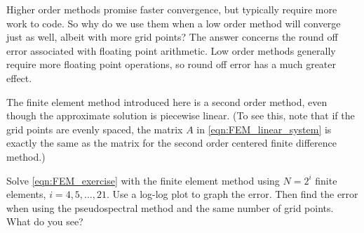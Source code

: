 \begin{problem}
Higher order methods promise faster convergence, but typically require more work to code.
So why do we use them when a low order method will converge just as well, albeit with more grid points?
The answer concerns the round off error associated with floating point arithmetic.
Low order methods generally require more floating point operations, so round off error has a much greater effect.

The finite element method introduced here is a second order method, even though the approximate solution is piecewise linear.
(To see this, note that if the grid points are evenly spaced, the matrix $A$ in \eqref{eqn:FEM_linear_system} is exactly the same as the matrix for the second order centered finite difference method.)

Solve \eqref{eqn:FEM_exercise} with the finite element method using $N = 2^i$  finite elements, $i = 4, 5, \ldots, 21$.
Use a log-log plot to graph the error.
Then find the error when using the pseudospectral method and the same number of grid points.
What do you see?
\end{problem}


